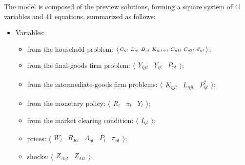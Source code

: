 \documentclass[../thesis.tex]{subfiles}
\begin{document}
The model is composed of the preview solutions, forming a square system of 41 variables and 41 equations, summarized as follows:

{\singlespacing
	
	\begin{itemize}

		\item Variables:
		
	\begin{itemize}
	
		\item from the household problem: $\langle \begin{smallmatrix} C_{\eta t} & L_{\eta t} & B_{\eta t} & K_{\eta, t+1} & C_{\eta 1t} & C_{\eta 2t} & {\mathscr{E}_{\eta t}} \end{smallmatrix} \rangle$;

		\item from the final-goods firm problem: $\langle \begin{smallmatrix} Y_{\eta jt} & Y_{\eta t} & P_{\eta t} \end{smallmatrix} \rangle$;

		\item from the intermediate-goods firm problems: $\langle \begin{smallmatrix} K_{\eta jt} & L_{\eta jt} & P_{\eta t}^{\ast} \end{smallmatrix} \rangle$;
		
		\item from the monetary policy: $\langle \begin{smallmatrix} R_{t} & \pi_{t} & Y_{t} \end{smallmatrix} \rangle$;
		
		\item from the market clearing condition: $\langle \begin{smallmatrix} I_{\eta t} \end{smallmatrix} \rangle$;
		
		\item prices: $\langle \begin{smallmatrix} W_{t} & R_{Kt} & \Lambda_{\eta t} & P_{t} & \pi_{\eta t} \end{smallmatrix} \rangle$;
		
		\item shocks: $\langle \begin{smallmatrix} Z_{A\eta t} & Z_{Mt} \end{smallmatrix} \rangle$.

	\end{itemize}


\end{itemize}}
\end{document}
